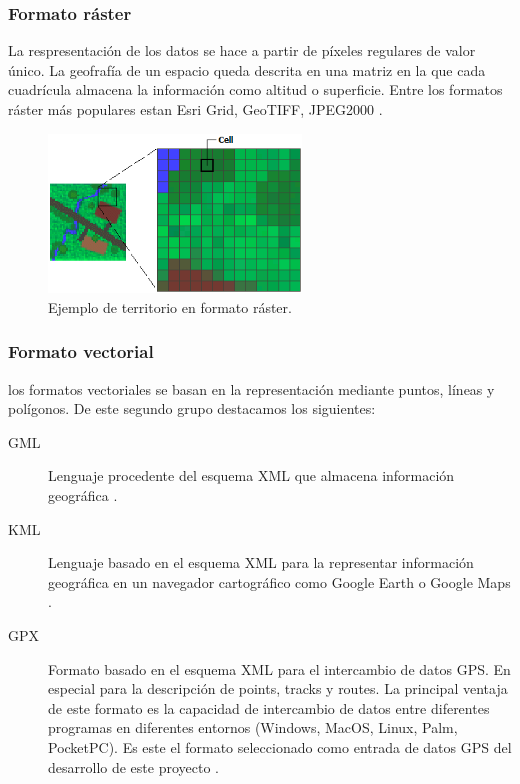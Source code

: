 \subsubsection{Formato ráster}
La respresentación de los datos se hace a partir de píxeles regulares de valor único.
La geofrafía de un espacio queda descrita en una matriz en la que cada cuadrícula 
almacena la información como altitud o superficie. Entre los formatos ráster más 
populares estan Esri Grid, GeoTIFF, JPEG2000 \cite{Morales01}.

\begin{figure}[htb]
\begin{center}
\includegraphics[width=0.6\textwidth]{./Imagenes/RasterImage.png}
\caption{Ejemplo de territorio en formato ráster. \cite{ArgGis01}}
\label{fig:PointGeneration02}
\end{center}
\end{figure}

\subsubsection{Formato vectorial}
los formatos vectoriales se basan en la representación mediante puntos, líneas y polígonos.
De este segundo grupo destacamos los siguientes:
\begin{description}
\item [\ac{GML}] Lenguaje procedente del esquema \ac{XML} que almacena información geográfica \cite{OGC01}.
\item[\ac{KML}] Lenguaje basado en el esquema \ac{XML} para la representar información 
geográfica en un navegador cartográfico como Google Earth o Google Maps \cite{OGC02}.%
\item[\ac{GPX}]Formato basado en el esquema \ac{XML} para el intercambio de datos \ac{GPS}. 
En especial para la descripción de points, tracks y routes. La principal ventaja  de este formato 
es la capacidad de intercambio de datos entre diferentes  programas en diferentes entornos 
(Windows, MacOS, Linux, Palm, PocketPC). Es este el formato seleccionado como entrada de datos 
\ac{GPS} del desarrollo de este proyecto \cite{Topografix01}.
\end{description}

